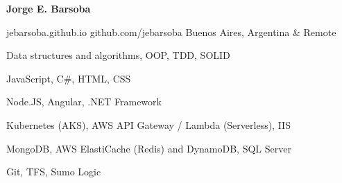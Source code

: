 \documentclass[11pt]{article} %
\begin{document}
\centerline{{\Huge \bf Jorge E. Barsoba}}

\bigskip

        {jebarsoba.github.io}
        {github.com/jebarsoba}
        {Buenos Aires, Argentina \& Remote}


      {Data structures and algorithms, OOP, TDD, SOLID}

      {JavaScript, C\#, HTML, CSS}

      {Node.JS, Angular, .NET Framework}

      {Kubernetes (AKS), AWS API Gateway / Lambda (Serverless), IIS}

      {MongoDB, AWS ElastiCache (Redis) and DynamoDB, SQL Server}

      {Git, TFS, Sumo Logic}

\end{document}
